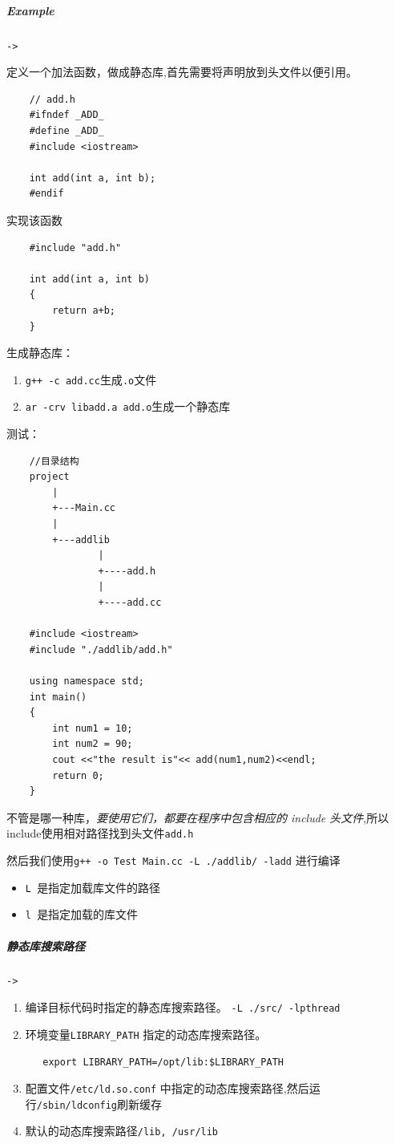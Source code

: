 \documentclass[UTF8,a4paper,12pt]{ctexbook}
\begin{document}
			\subparagraph{Example}\verb|->|
				
				定义一个加法函数，做成静态库,首先需要将声明放到头文件以便引用。
				\begin{lstlisting}
	// add.h
	#ifndef _ADD_
	#define _ADD_
	#include <iostream>
	
	int add(int a, int b);
	#endif
				\end{lstlisting}
				
				实现该函数
				\begin{lstlisting}
	#include "add.h"
	
	int add(int a, int b)
	{
		return a+b;
	}
				\end{lstlisting}
			
				生成静态库：
				\begin{enumerate}[itemindent = 2em]
					\item \verb|g++ -c add.cc|生成\verb|.o|文件
					\item \verb|ar -crv libadd.a add.o|生成一个静态库
				\end{enumerate}
				
				
				测试：
				\begin{lstlisting}
	//目录结构
	project
		|
		+---Main.cc
		|
		+---addlib
				|
				+----add.h
				|
				+----add.cc
	
	#include <iostream>
	#include "./addlib/add.h"
	
	using namespace std;
	int main()
	{
		int num1 = 10;
		int num2 = 90;
		cout <<"the result is"<< add(num1,num2)<<endl;
		return 0;
	}
				\end{lstlisting}
				不管是哪一种库，\textit{要使用它们，都要在程序中包含相应的 include 头文件},所以include使用相对路径找到头文件\verb|add.h|
				
				然后我们使用\verb|g++ -o Test Main.cc -L ./addlib/ -ladd| 进行编译
				
				\begin{itemize}[itemindent = 2em]
					\item \verb|L |是指定加载库文件的路径
					\item \verb|l |是指定加载的库文件
				\end{itemize}
				
			\subparagraph{静态库搜索路径}\verb|->|
			
				\begin{enumerate}[itemindent= 2em]
					\item 编译目标代码时指定的静态库搜索路径。 \verb|-L ./src/ -lpthread|
					\item 环境变量\verb|LIBRARY_PATH| 指定的动态库搜索路径。
					
					 \verb|   export LIBRARY_PATH=/opt/lib:$LIBRARY_PATH|
					\item 配置文件\verb|/etc/ld.so.conf| 中指定的动态库搜索路径,然后运行\verb|/sbin/ldconfig|刷新缓存
					\item 默认的动态库搜索路径\verb|/lib, /usr/lib|
				\end{enumerate}
				
\end{document}
